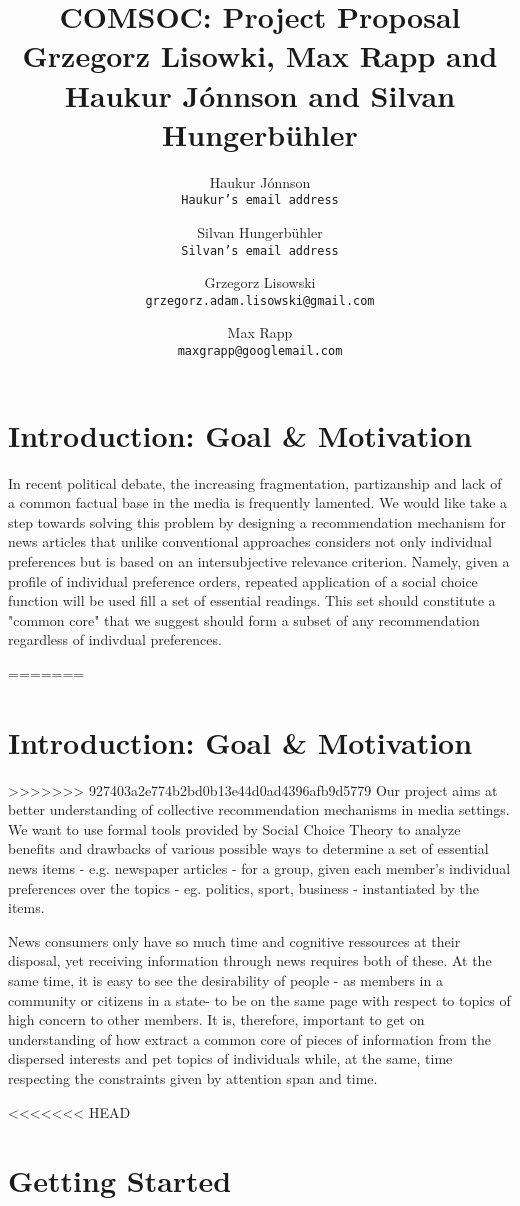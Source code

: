 \documentclass[10pt,a4paper, english]{article}
\author{
    Haukur J{\'o}nnson\\    \texttt{Haukur's email address}
    \and
    Silvan Hungerb{\"u}hler\\   \texttt{Silvan's email address}
    \and
    Grzegorz Lisowski\\  \texttt{grzegorz.adam.lisowski@gmail.com}
    \and
    Max Rapp\\  \texttt{maxgrapp@googlemail.com}
}
\title{%
  COMSOC: Project Proposal \\
  \small Grzegorz Lisowki, Max Rapp and Haukur J{\'o}nnson and Silvan Hungerb{\"u}hler }
\date{}
\begin{document}
\maketitle

\section{Introduction: Goal \& Motivation}

In recent political debate, the increasing fragmentation, partizanship and lack of a common factual base in the media is frequently lamented. We would like take a step towards solving this problem by designing a recommendation mechanism for news articles that unlike conventional approaches considers not only individual preferences but is based on an intersubjective relevance criterion. Namely, given a profile of individual preference orders, repeated application of a social choice function will be used fill a set of essential readings. This set should constitute a "common core" that we suggest should form a subset of any recommendation regardless of indivdual preferences.

=======
\section{Introduction: Goal \& Motivation}
>>>>>>> 927403a2e774b2bd0b13e44d0ad4396afb9d5779
Our project aims at better understanding of collective recommendation mechanisms in media settings. We want to use formal tools provided by Social Choice Theory to analyze benefits and drawbacks of various possible ways to determine a set of essential news items - e.g. newspaper articles - for a group, given each member's individual preferences over the topics - eg. politics, sport, business - instantiated by the items.

News consumers only have so much time and cognitive ressources at their disposal, yet receiving information through news requires both of these. At the same time, it is easy to see the desirability of people - as members in a community or citizens in a state- to be on the same page with respect to topics of high concern to other members. It is, therefore, important to get on understanding of how extract a common core of pieces of information from the dispersed interests and pet topics of individuals while, at the same, time respecting the constraints given by attention span and time.

<<<<<<< HEAD
\section{Getting Started}
\end{document}
